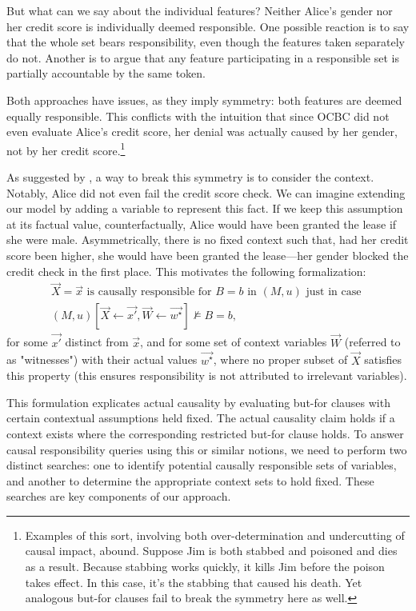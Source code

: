 \documentclass{article}
\begin{document}
But what can we say about the individual features? Neither Alice’s gender nor her credit score is individually deemed responsible. One possible reaction is to say that the whole set bears responsibility, even though the features taken separately do not. Another is to argue that any feature participating in a responsible set is partially accountable by the same token.  

Both approaches have issues, as they imply symmetry: both features are deemed equally responsible. This conflicts with the intuition that since OCBC did not even evaluate Alice’s credit score, her denial was actually caused by her gender, not by her credit score.\footnote{Examples of this sort, involving both over-determination and undercutting of causal impact, abound. Suppose Jim is both stabbed and poisoned and dies as a result. Because stabbing works quickly, it kills Jim before the poison takes effect. In this case, it’s the stabbing that caused his death. Yet analogous but-for clauses fail to break the symmetry here as well.}


As suggested by \cite{actualCausalityHalpern}, a way to break this symmetry is to consider the context. Notably, Alice did not even fail the credit score check. We can imagine extending our model by adding a variable to represent this fact. If we keep this assumption at its factual value, counterfactually, Alice would have been granted the lease if she were male. Asymmetrically, there is no fixed context such that, had her credit score been higher, she would have been granted the lease—her gender blocked the credit check in the first place. This motivates the following formalization:  
\begin{align*}
\vec{X} = \vec{x} \text{ is causally responsible for } B=b \text{ in } (M, u) \text{ just in case }  \\
(M, u)[\vec{X} \leftarrow \vec{x'}, \vec{W} \leftarrow \vec{w^\star}] \not \models B=b,
\end{align*}
\noindent for some \(\vec{x'}\) distinct from \(\vec{x}\), and for some set of context variables \(\vec{W}\) (referred to as "witnesses") with their actual values \(\vec{w^\star}\), where no proper subset of \(\vec{X}\) satisfies this property (this ensures responsibility is not attributed to irrelevant variables).  

This formulation explicates actual causality by evaluating but-for clauses with certain contextual assumptions held fixed. The actual causality claim holds if a context exists where the corresponding restricted but-for clause holds.   To answer causal responsibility queries using this or similar notions, we need to perform two distinct searches: one to identify potential causally responsible sets of variables, and another to determine the appropriate context sets to hold fixed. These searches are key components of our approach.
\end{document}
